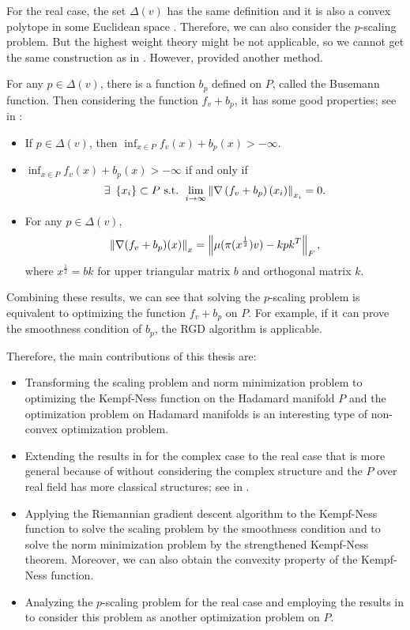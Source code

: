 \documentclass[suri,pdfbookmark]{engsuribt} %
\begin{document}
  For the real case, the set $\Delta(v)$ has the same definition and it is also a convex polytope in some Euclidean space \cite{key10,key11}. Therefore, we can also consider the $p$-scaling problem. But the highest weight theory might be not applicable, so we cannot get the same construction as in \cite{key8}. However, \cite{key12} provided another method.

  For any $p \in \Delta(v)$, there is a function $b_p$ defined on $P$, called the Busemann function. Then considering the function $f_v + b_p$, it has some good properties; see in \cite{key12}:
  \begin{itemize}
    \item If $p \in \Delta(v)$, then $\inf_{x \in P}f_v(x)+b_p(x) > -\infty$.
    \item $\inf_{x \in P}f_v(x)+b_p(x) > -\infty$ if and only if
    \begin{equation*}
      \exists~\left\{x_i\right\} \subset P \text{ s.t. }\lim_{i \rightarrow \infty}\left\lVert\nabla \left(f_v+b_p\right)(x_i)\right\lVert_{x_i} = 0.
    \end{equation*}
    \item For any $p \in \Delta(v)$,
      \vspace{-0.5em} 
      \begin{equation*}
        \left\lVert\nabla(f_v+b_p)(x)\right\lVert_{x} = \left\lVert\mu(\pi(x^{\frac{1}{2}})v)-kpk^T\right\lVert_{F},
      \end{equation*}
      where $x^{\frac{1}{2}} = bk$ for upper triangular matrix $b$ and orthogonal matrix $k$.
  \end{itemize}
  Combining these results, we can see that solving the $p$-scaling problem is equivalent to optimizing the function $f_v+b_p$ on $P$. For example, if it can prove the smoothness condition of $b_p$, the RGD algorithm is applicable.

  Therefore, the main contributions of this thesis are:
  \begin{itemize}
    \item Transforming the scaling problem and norm minimization problem to optimizing the Kempf-Ness function on the Hadamard manifold $P$ and the optimization problem on Hadamard manifolds is an interesting type of non-convex optimization problem.
    \item Extending the results in \cite{key8} for the complex case to the real case that is more general because of without considering the complex structure and the $P$ over real field has more classical structures; see in \cite{key26}.
    \item Applying the Riemannian gradient descent algorithm to the Kempf-Ness function to solve the scaling problem by the smoothness condition and to solve the norm  minimization problem by the strengthened Kempf-Ness theorem. Moreover, we can also obtain the convexity property of the Kempf-Ness function.
    \item Analyzing the $p$-scaling problem for the real case and employing the results in \cite{key12} to consider this problem as another optimization problem on $P$.
  \end{itemize}
\end{document}
